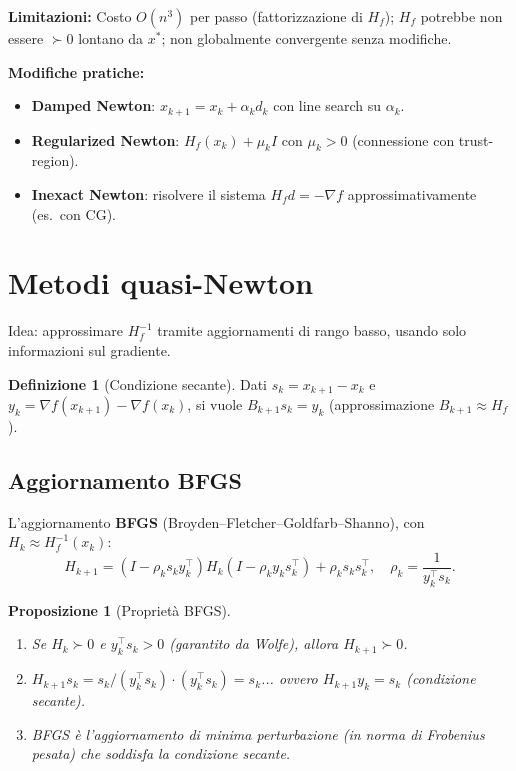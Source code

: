 \documentclass[11pt, a4paper, twoside]{book}
\theoremstyle{definition}
\newtheorem{defn}{Definizione}[chapter]
\theoremstyle{plain}
\newtheorem{prop}{Proposizione}[chapter]
\theoremstyle{remark}
\begin{document}
\textbf{Limitazioni:} Costo $O(n^3)$ per passo (fattorizzazione di $H_f$); $H_f$ potrebbe non essere $\succ 0$ lontano da $x^*$; non globalmente convergente senza modifiche.

\textbf{Modifiche pratiche:}
\begin{itemize}
  \item \textbf{Damped Newton}: $x_{k+1} = x_k + \alpha_k d_k$ con line search su $\alpha_k$.
  \item \textbf{Regularized Newton}: $H_f(x_k) + \mu_k I$ con $\mu_k > 0$ (connessione con trust-region).
  \item \textbf{Inexact Newton}: risolvere il sistema $H_f d = -\nabla f$ approssimativamente (es.\ con CG).
\end{itemize}

\section{Metodi quasi-Newton}

Idea: approssimare $H_f^{-1}$ tramite aggiornamenti di rango basso, usando solo informazioni sul gradiente.

\begin{defn}[Condizione secante]
Dati $s_k = x_{k+1} - x_k$ e $y_k = \nabla f(x_{k+1}) - \nabla f(x_k)$, si vuole $B_{k+1} s_k = y_k$ (approssimazione $B_{k+1} \approx H_f$).
\end{defn}

\subsection{Aggiornamento BFGS}

L'aggiornamento \textbf{BFGS} (Broyden--Fletcher--Goldfarb--Shanno), con $H_k \approx H_f^{-1}(x_k)$:
\begin{equation}
  H_{k+1} = \left(I - \rho_k s_k y_k^\top\right) H_k \left(I - \rho_k y_k s_k^\top\right) + \rho_k s_k s_k^\top,
  \quad \rho_k = \frac{1}{y_k^\top s_k}.
\end{equation}

\begin{prop}[Proprietà BFGS]
\begin{enumerate}
  \item Se $H_k \succ 0$ e $y_k^\top s_k > 0$ (garantito da Wolfe), allora $H_{k+1} \succ 0$.
  \item $H_{k+1} s_k = s_k / (y_k^\top s_k) \cdot (y_k^\top s_k) = s_k$... ovvero $H_{k+1} y_k = s_k$ (condizione secante).
  \item BFGS è l'aggiornamento di minima perturbazione (in norma di Frobenius pesata) che soddisfa la condizione secante.
\end{enumerate}
\end{prop}
\end{document}
